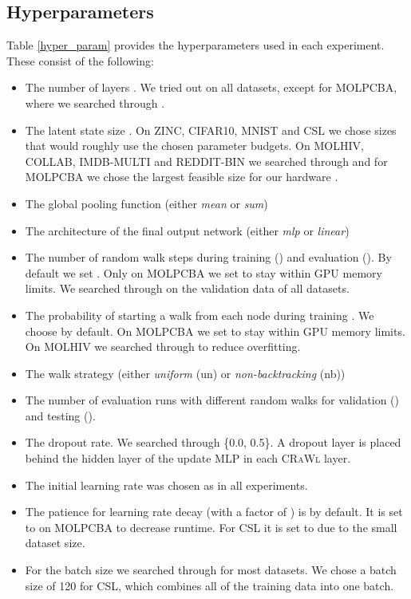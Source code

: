 \documentclass{scrartcl} \usepackage[dvipsnames]{xcolor}
\newcommand{\crawl}{\textsc{CRaWl}}
\begin{document}
\subsection{Hyperparameters}
Table \ref{hyper_param} provides the hyperparameters used in each experiment.
These consist of the following:
\begin{itemize}
    \item The number of layers . 
    We tried out  on all datasets, except for MOLPCBA, where we searched through .
    \item The latent state size . On ZINC, CIFAR10, MNIST and CSL we chose sizes that would roughly use the chosen parameter budgets. On MOLHIV, COLLAB, IMDB-MULTI and REDDIT-BIN we searched through  and for MOLPCBA we chose the largest feasible size for our hardware . 
    \item The global pooling function (either \emph{mean} or \emph{sum})
    \item The architecture of the final output network (either \emph{mlp} or \emph{linear})
    \item The number of random walk steps during training () and evaluation (). 
    By default we set . 
    Only on MOLPCBA we set  to stay within GPU memory limits.
    We searched through  on the validation data of all datasets.
    \item The probability of starting a walk from each node during training .
    We choose  by default.
    On MOLPCBA we set  to stay within GPU memory limits.
    On MOLHIV we searched through  to reduce overfitting.
    \item The walk strategy (either \emph{uniform} (un) or \emph{non-backtracking} (nb))
    \item The number of evaluation runs with different random walks for validation () and testing ().
    \item The dropout rate. We searched through \{0.0, 0.5\}. A dropout layer is placed behind the hidden layer of the update MLP  in each \crawl{} layer.
    \item The initial learning rate  was chosen as  in all experiments.
    \item The patience for learning rate decay (with a factor of ) is  by default. It is set to  on MOLPCBA to decrease runtime.
    For CSL it is set to  due to the small dataset size.
    \item For the batch size we searched through  for most datasets.
    We chose a batch size of 120 for CSL, which combines all of the training data into one batch.
\end{itemize}
\end{document}
